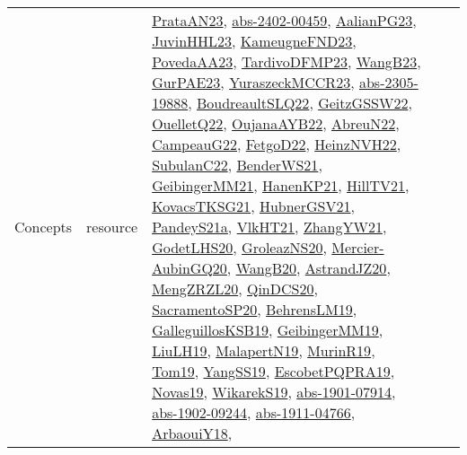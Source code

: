 {\begin{longtable}{lp{3cm}>{\raggedright}p{6cm}>{\raggedright}p{6cm}p{8cm}}
Concepts & resource & \href{articles/PrataAN23.pdf}{PrataAN23}\cite{PrataAN23}, \href{articles/abs-2402-00459.pdf}{abs-2402-00459}\cite{abs-2402-00459}, \href{papers/AalianPG23.pdf}{AalianPG23}\cite{AalianPG23}, \href{papers/JuvinHHL23.pdf}{JuvinHHL23}\cite{JuvinHHL23}, \href{papers/KameugneFND23.pdf}{KameugneFND23}\cite{KameugneFND23}, \href{papers/PovedaAA23.pdf}{PovedaAA23}\cite{PovedaAA23}, \href{papers/TardivoDFMP23.pdf}{TardivoDFMP23}\cite{TardivoDFMP23}, \href{papers/WangB23.pdf}{WangB23}\cite{WangB23}, \href{articles/GurPAE23.pdf}{GurPAE23}\cite{GurPAE23}, \href{articles/YuraszeckMCCR23.pdf}{YuraszeckMCCR23}\cite{YuraszeckMCCR23}, \href{articles/abs-2305-19888.pdf}{abs-2305-19888}\cite{abs-2305-19888}, \href{papers/BoudreaultSLQ22.pdf}{BoudreaultSLQ22}\cite{BoudreaultSLQ22}, \href{papers/GeitzGSSW22.pdf}{GeitzGSSW22}\cite{GeitzGSSW22}, \href{papers/OuelletQ22.pdf}{OuelletQ22}\cite{OuelletQ22}, \href{papers/OujanaAYB22.pdf}{OujanaAYB22}\cite{OujanaAYB22}, \href{articles/AbreuN22.pdf}{AbreuN22}\cite{AbreuN22}, \href{articles/CampeauG22.pdf}{CampeauG22}\cite{CampeauG22}, \href{articles/FetgoD22.pdf}{FetgoD22}\cite{FetgoD22}, \href{articles/HeinzNVH22.pdf}{HeinzNVH22}\cite{HeinzNVH22}, \href{articles/SubulanC22.pdf}{SubulanC22}\cite{SubulanC22}, \href{papers/BenderWS21.pdf}{BenderWS21}\cite{BenderWS21}, \href{papers/GeibingerMM21.pdf}{GeibingerMM21}\cite{GeibingerMM21}, \href{papers/HanenKP21.pdf}{HanenKP21}\cite{HanenKP21}, \href{papers/HillTV21.pdf}{HillTV21}\cite{HillTV21}, \href{papers/KovacsTKSG21.pdf}{KovacsTKSG21}\cite{KovacsTKSG21}, \href{articles/HubnerGSV21.pdf}{HubnerGSV21}\cite{HubnerGSV21}, \href{articles/PandeyS21a.pdf}{PandeyS21a}\cite{PandeyS21a}, \href{articles/VlkHT21.pdf}{VlkHT21}\cite{VlkHT21}, \href{articles/ZhangYW21.pdf}{ZhangYW21}\cite{ZhangYW21}, \href{papers/GodetLHS20.pdf}{GodetLHS20}\cite{GodetLHS20}, \href{papers/GroleazNS20.pdf}{GroleazNS20}\cite{GroleazNS20}, \href{papers/Mercier-AubinGQ20.pdf}{Mercier-AubinGQ20}\cite{Mercier-AubinGQ20}, \href{papers/WangB20.pdf}{WangB20}\cite{WangB20}, \href{articles/AstrandJZ20.pdf}{AstrandJZ20}\cite{AstrandJZ20}, \href{articles/MengZRZL20.pdf}{MengZRZL20}\cite{MengZRZL20}, \href{articles/QinDCS20.pdf}{QinDCS20}\cite{QinDCS20}, \href{articles/SacramentoSP20.pdf}{SacramentoSP20}\cite{SacramentoSP20}, \href{papers/BehrensLM19.pdf}{BehrensLM19}\cite{BehrensLM19}, \href{papers/GalleguillosKSB19.pdf}{GalleguillosKSB19}\cite{GalleguillosKSB19}, \href{papers/GeibingerMM19.pdf}{GeibingerMM19}\cite{GeibingerMM19}, \href{papers/LiuLH19.pdf}{LiuLH19}\cite{LiuLH19}, \href{papers/MalapertN19.pdf}{MalapertN19}\cite{MalapertN19}, \href{papers/MurinR19.pdf}{MurinR19}\cite{MurinR19}, \href{papers/Tom19.pdf}{Tom19}\cite{Tom19}, \href{papers/YangSS19.pdf}{YangSS19}\cite{YangSS19}, \href{articles/EscobetPQPRA19.pdf}{EscobetPQPRA19}\cite{EscobetPQPRA19}, \href{articles/Novas19.pdf}{Novas19}\cite{Novas19}, \href{articles/WikarekS19.pdf}{WikarekS19}\cite{WikarekS19}, \href{articles/abs-1901-07914.pdf}{abs-1901-07914}\cite{abs-1901-07914}, \href{articles/abs-1902-09244.pdf}{abs-1902-09244}\cite{abs-1902-09244}, \href{articles/abs-1911-04766.pdf}{abs-1911-04766}\cite{abs-1911-04766}, \href{papers/ArbaouiY18.pdf}{ArbaouiY18}\cite{ArbaouiY18}, 
\end{longtable}}
